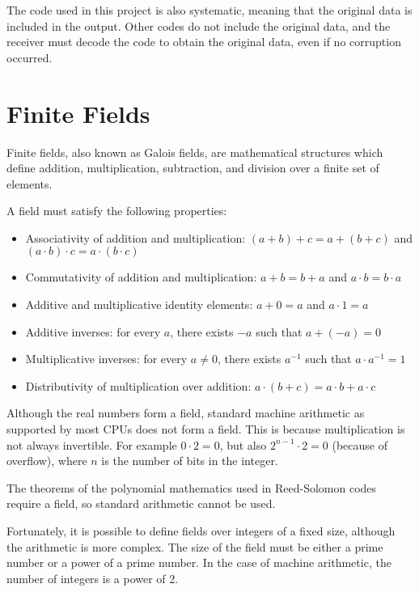 The code used in this project is also systematic, meaning that the original data is included in the output.
Other codes do not include the original data, and the receiver must decode the code to obtain the original data, even if no corruption occurred.

\section{Finite Fields}

Finite fields, also known as Galois fields, are mathematical structures which define addition, multiplication, subtraction, and division over a finite set of elements. \cite{finite-fields-2nd-ed}

A field must satisfy the following properties:

\begin{itemize}
    \item Associativity of addition and multiplication: $(a + b) + c = a + (b + c)$ and $(a \cdot b) \cdot c = a \cdot (b \cdot c)$
    \item Commutativity of addition and multiplication: $a + b = b + a$ and $a \cdot b = b \cdot a$
    \item Additive and multiplicative identity elements: $a + 0 = a$ and $a \cdot 1 = a$
    \item Additive inverses: for every $a$, there exists $-a$ such that $a + (-a) = 0$
    \item Multiplicative inverses: for every $a \neq 0$, there exists $a^{-1}$ such that $a \cdot a^{-1} = 1$
    \item Distributivity of multiplication over addition: $a \cdot (b + c) = a \cdot b + a \cdot c$
\end{itemize}

Although the real numbers form a field, standard machine arithmetic as supported by most CPUs does not form a field.
This is because multiplication is not always invertible. For example $0 \cdot 2 = 0$, but also $2^{n - 1} \cdot 2 = 0$ (because of overflow), where $n$ is the number of bits in the integer.

The theorems of the polynomial mathematics used in Reed-Solomon codes require a field, so standard arithmetic cannot be used.

Fortunately, it is possible to define fields over integers of a fixed size, although the arithmetic is more complex.
The size of the field must be either a prime number or a power of a prime number.
In the case of machine arithmetic, the number of integers is a power of 2.

